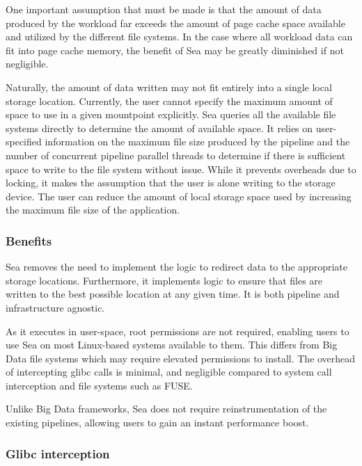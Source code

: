 \documentclass[10pt,journal,compsoc]{IEEEtran}
\newcommand{\todo}[1]{\marginpar{\parbox{18mm}{\flushleft\tiny\color{red}\textbf{TODO}: #1}}}
\begin{document}
One important assumption that must be made is that the amount of data produced
by the workload far exceeds the amount of page cache space available and
utilized by the different file systems. In the case where all workload data can
fit into page cache memory, the benefit of Sea may be greatly diminished if not
negligible.

Naturally, the amount of data written may not fit entirely into a single local
storage location. Currently, the user cannot specify the maximum amount of space
to use in a given mountpoint explicitly. Sea queries all the available file
systems directly to determine the amount of available space. It relies on
user-specified information on the maximum file size produced by the pipeline and
the number of concurrent pipeline parallel threads to determine if there is
sufficient space to write to the file system without issue. While it prevents
overheads due to locking, it makes the assumption that the user is alone writing
to the storage device. The user can reduce the amount of local storage space
used by increasing the maximum file size of the application.



\subsubsection{Benefits}
Sea removes the need to implement the logic to redirect data to the appropriate
storage locations. Furthermore, it implements logic to ensure that files are
written to the best possible location at any given time. It is both pipeline and
infrastructure agnostic.

As it executes in user-space, root permissions are not required, enabling users
to use Sea on most Linux-based systems available to them. This differs from Big
Data file systems which may require elevated permissions to install. The
overhead of intercepting glibc calls is minimal, and negligible compared to
system call interception and file systems such as FUSE.

Unlike Big Data frameworks, Sea does not require reinstrumentation of the
existing pipelines, allowing users to gain an instant performance boost.

\subsubsection{Glibc interception}
\end{document}
